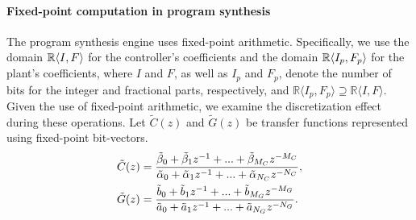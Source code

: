 \documentclass[final]{sig-alternate-05-2015}
\newcommand{\red}[1]{{\color{red}#1}}
\begin{document}

\paragraph{Fixed-point computation in program synthesis}

The program synthesis engine uses fixed-point arithmetic.  Specifically, we
use the domain $\mathbb{R}\langle{I},{F}\rangle$ for the controller's coefficients
and the domain $\mathbb{R}\langle{I_p},{F_p}\rangle$ for the plant's coefficients,
where $I$ and $F$, as well as $I_p$ and $F_p$, denote the number of bits for
the integer and fractional parts, respectively, and $\mathbb{R}\langle
I_p,F_p \rangle \supseteq \mathbb{R}\langle I,F \rangle$.
%
%
Given the use of fixed-point arithmetic, we examine the discretization effect 
during these operations. Let $\tilde C(z)$ and $\tilde G(z)$ be 
transfer functions represented using fixed-point bit-vectors.
%
\begin{align}
\small
\label{digital_controller_plant_tf}
\tilde C(z)&=\frac{\tilde \beta_{0}+\tilde \beta_{1}z^{-1}+...+\tilde \beta_{M_C}z^{-M_C}}{\tilde \alpha_{0}+\tilde \alpha_{1}z^{-1}+...+\tilde \alpha_{N_C}z^{-N_C}}, \\
\tilde G(z)&=\frac{\tilde b_{0}+\tilde b_{1}z^{-1}+...+\tilde b_{M_G}z^{-M_G}}{\tilde a_{0}+\tilde a_{1}z^{-1}+...+\tilde a_{N_G}z^{-N_G}}.
\end{align}
 
\end{document}
